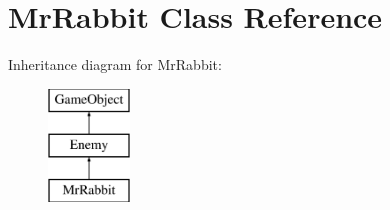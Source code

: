 \hypertarget{class_mr_rabbit}{}\section{Mr\+Rabbit Class Reference}
\label{class_mr_rabbit}
Inheritance diagram for Mr\+Rabbit\+:\begin{figure}[H]
\begin{center}
\leavevmode
\includegraphics[height=3.000000cm]{class_mr_rabbit}
\end{center}
\end{figure}
